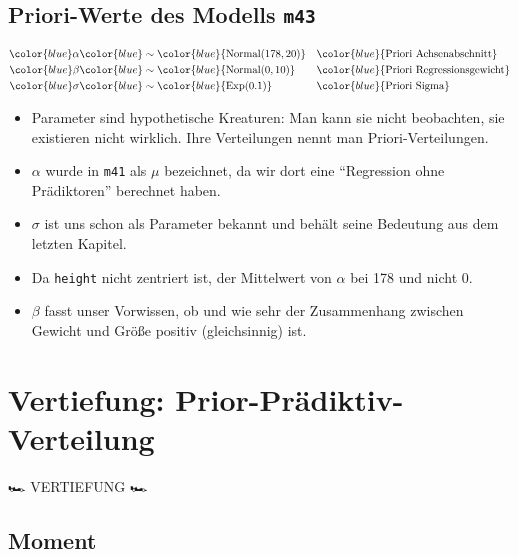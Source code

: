 \documentclass[
  a4paper,
  DIV=11]{scrreprt}
\providecommand{\tightlist}{%
  \setlength{\itemsep}{0pt}\setlength{\parskip}{0pt}}\usepackage{longtable,booktabs,array}
\theoremstyle{definition}
\theoremstyle{remark}
\begin{document}
\hypertarget{priori-werte-des-modells-m43}{%
\subsection{\texorpdfstring{Priori-Werte des Modells
\texttt{m43}}{Priori-Werte des Modells m43}}\label{priori-werte-des-modells-m43}}

\begin{align*}
\color{blue}\alpha & \color{blue}\sim \color{blue}{\operatorname{Normal}(178, 20)} && \color{blue}{\text{Priori Achsenabschnitt}} \\
\color{blue}\beta  & \color{blue}\sim \color{blue}{\operatorname{Normal}(0, 10)}  && \color{blue}{\text{Priori Regressionsgewicht}}\\
\color{blue}\sigma & \color{blue}\sim \color{blue}{\operatorname{Exp}(0.1)}  && \color{blue}{\text{Priori Sigma}}
\end{align*}

\begin{itemize}
\tightlist
\item
  Parameter sind hypothetische Kreaturen: Man kann sie nicht beobachten,
  sie existieren nicht wirklich. Ihre Verteilungen nennt man
  Priori-Verteilungen.
\item
  \(\alpha\) wurde in \texttt{m41} als \(\mu\) bezeichnet, da wir dort
  eine ``Regression ohne Prädiktoren'' berechnet haben.
\item
  \(\sigma\) ist uns schon als Parameter bekannt und behält seine
  Bedeutung aus dem letzten Kapitel.
\item
  Da \texttt{height} nicht zentriert ist, der Mittelwert von \(\alpha\)
  bei 178 und nicht 0.
\item
  \(\beta\) fasst unser Vorwissen, ob und wie sehr der Zusammenhang
  zwischen Gewicht und Größe positiv (gleichsinnig) ist.
\end{itemize}

\hypertarget{vertiefung-prior-pruxe4diktiv-verteilung}{%
\section{Vertiefung:
Prior-Prädiktiv-Verteilung}\label{vertiefung-prior-pruxe4diktiv-verteilung}}

🏎️ VERTIEFUNG 🏎️

\hypertarget{moment}{%
\subsection{Moment}\label{moment}}
\end{document}
